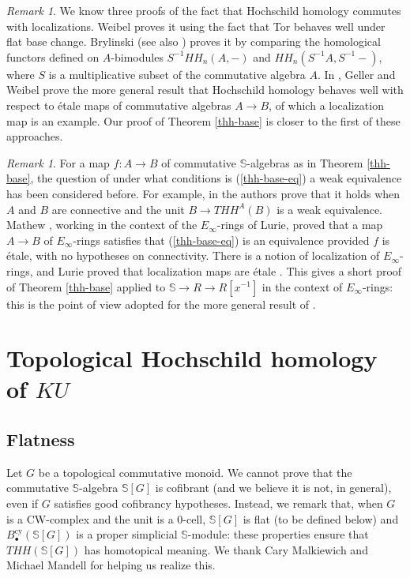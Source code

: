 \documentclass[a4paper,11pt]{amsart} %
\theoremstyle{definition} \newtheorem{defn}[equation]{Definition}
\theoremstyle{remark} \newtheorem{notation}[equation]{Notation}
\theoremstyle{plain} \newtheorem{teo}[equation]{Theorem}
\theoremstyle{plain} \newtheorem{lema}[equation]{Lemma}
\theoremstyle{plain} \newtheorem{prop}[equation]{Proposition}
\theoremstyle{plain} \newtheorem{corolario}[equation]{Corollary}
\theoremstyle{remark} \newtheorem{obs}[equation]{Remark}
\theoremstyle{remark} \newtheorem{sideobs}[equation]{Side remark}
\theoremstyle{remark} \newtheorem{ejercicio}[equation]{Exercise}
\theoremstyle{definition} \newtheorem{notn}[equation]{Notation}
\theoremstyle{remark} \newtheorem{ej}[equation]{Example}
\theoremstyle{remark} \newtheorem{contraej}[equation]{Counterexample}
\theoremstyle{plain} \newtheorem{conj}[equation]{Conjecture}
\renewcommand{\1}{\ensuremath{\mathbbm{1}}}
\renewcommand{\S}{\mathbb{S}}
\newcommand{\bobs}{\begin{obs}}
\newcommand{\eobs}{\end{obs}}
\newcommand{\cy}{\mathrm{cy}}
\numberwithin{equation}{section}
\begin{document}
\bobs We know three proofs of the fact that Hochschild homology commutes with localizations. Weibel \cite[9.1.8(3)]{weibel} proves it using the fact that Tor behaves well under flat base change. Brylinski \cite{brylinski} (see also \cite[1.1.17]{loday}) proves it by comparing the homological functors defined on $A$-bimodules $S^{-1}HH_n(A,-)$ and $HH_n(S^{-1}A,S^{-1}-)$, where $S$ is a multiplicative subset of the commutative algebra $A$. In \cite{weibel-geller}, Geller and Weibel prove the more general result that Hochschild homology behaves well with respect to étale maps of commutative algebras $A\to B$, of which a localization map is an example. Our proof of Theorem \ref{thh-base} is closer to the first of these approaches. %
\eobs


\bobs For a map $f:A\to B$ of commutative $\S$-algebras as in Theorem \ref{thh-base}, the question of under what conditions is (\ref{thh-base-eq}) a weak equivalence has been considered before. For example, in \cite[Lemma 5.7]{mccarthy-minasian} the authors prove that it holds when $A$ and $B$ are connective and the unit $B\to THH^A(B)$ is a weak equivalence. Mathew \cite[Theorem 1.3]{mathew-thh}, working in the context of the $E_\infty$-rings of Lurie, proved that a map $A\to B$ of $E_\infty$-rings satisfies that (\ref{thh-base-eq}) is an equivalence provided $f$ is étale, with no hypotheses on connectivity. There is a notion of localization of $E_\infty$-rings, and Lurie proved that localization maps are étale \cite[7.5.1.13]{ha}. This gives a short proof of Theorem \ref{thh-base} applied to $\S\to R\to R[x^{-1}]$ in the context of $E_\infty$-rings: this is the point of view adopted for the more general result of \cite[Corollary 7.4]{rsv-thom}.
\eobs


\section{Topological Hochschild homology of \texorpdfstring{$KU$}{KU}} \label{sect:thhku}


\subsection{Flatness} \label{sect:cofibrancy}

%
Let $G$ be a topological commutative monoid. We cannot prove that the commutative $\S$-algebra $\S[G]$ is cofibrant (and we believe it is not, in general), even if $G$ satisfies good cofibrancy hypotheses. Instead, we remark that, when $G$ is a CW-complex and the unit is a 0-cell, $\S[G]$ is flat (to be defined below) and $B^\cy_\bullet(\S[G])$ is a proper simplicial $\S$-module: these properties ensure that $THH(\S[G])$ has homotopical meaning. We thank Cary Malkiewich and Michael Mandell for helping us realize this.
\end{document}

